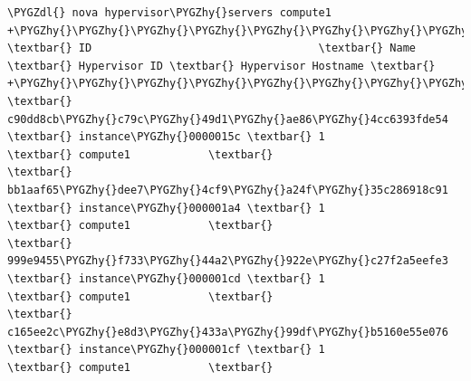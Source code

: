 \documentclass[letterpaper,10pt,english]{sphinxmanual}
\def\PYGZdl{\char`\$}
\def\PYGZhy{\char`\-}
\begin{document}
\begin{enumerate}
\begin{Verbatim}[commandchars=\\\{\}]
\PYGZdl{} nova hypervisor\PYGZhy{}servers compute1
+\PYGZhy{}\PYGZhy{}\PYGZhy{}\PYGZhy{}\PYGZhy{}\PYGZhy{}\PYGZhy{}\PYGZhy{}\PYGZhy{}\PYGZhy{}\PYGZhy{}\PYGZhy{}\PYGZhy{}\PYGZhy{}\PYGZhy{}\PYGZhy{}\PYGZhy{}\PYGZhy{}\PYGZhy{}\PYGZhy{}\PYGZhy{}\PYGZhy{}\PYGZhy{}\PYGZhy{}\PYGZhy{}\PYGZhy{}\PYGZhy{}\PYGZhy{}\PYGZhy{}\PYGZhy{}\PYGZhy{}\PYGZhy{}\PYGZhy{}\PYGZhy{}\PYGZhy{}\PYGZhy{}\PYGZhy{}\PYGZhy{}+\PYGZhy{}\PYGZhy{}\PYGZhy{}\PYGZhy{}\PYGZhy{}\PYGZhy{}\PYGZhy{}\PYGZhy{}\PYGZhy{}\PYGZhy{}\PYGZhy{}\PYGZhy{}\PYGZhy{}\PYGZhy{}\PYGZhy{}\PYGZhy{}\PYGZhy{}\PYGZhy{}\PYGZhy{}+\PYGZhy{}\PYGZhy{}\PYGZhy{}\PYGZhy{}\PYGZhy{}\PYGZhy{}\PYGZhy{}\PYGZhy{}\PYGZhy{}\PYGZhy{}\PYGZhy{}\PYGZhy{}\PYGZhy{}\PYGZhy{}\PYGZhy{}+\PYGZhy{}\PYGZhy{}\PYGZhy{}\PYGZhy{}\PYGZhy{}\PYGZhy{}\PYGZhy{}\PYGZhy{}\PYGZhy{}\PYGZhy{}\PYGZhy{}\PYGZhy{}\PYGZhy{}\PYGZhy{}\PYGZhy{}\PYGZhy{}\PYGZhy{}\PYGZhy{}\PYGZhy{}\PYGZhy{}\PYGZhy{}+
\textbar{} ID                                   \textbar{} Name              \textbar{} Hypervisor ID \textbar{} Hypervisor Hostname \textbar{}
+\PYGZhy{}\PYGZhy{}\PYGZhy{}\PYGZhy{}\PYGZhy{}\PYGZhy{}\PYGZhy{}\PYGZhy{}\PYGZhy{}\PYGZhy{}\PYGZhy{}\PYGZhy{}\PYGZhy{}\PYGZhy{}\PYGZhy{}\PYGZhy{}\PYGZhy{}\PYGZhy{}\PYGZhy{}\PYGZhy{}\PYGZhy{}\PYGZhy{}\PYGZhy{}\PYGZhy{}\PYGZhy{}\PYGZhy{}\PYGZhy{}\PYGZhy{}\PYGZhy{}\PYGZhy{}\PYGZhy{}\PYGZhy{}\PYGZhy{}\PYGZhy{}\PYGZhy{}\PYGZhy{}\PYGZhy{}\PYGZhy{}+\PYGZhy{}\PYGZhy{}\PYGZhy{}\PYGZhy{}\PYGZhy{}\PYGZhy{}\PYGZhy{}\PYGZhy{}\PYGZhy{}\PYGZhy{}\PYGZhy{}\PYGZhy{}\PYGZhy{}\PYGZhy{}\PYGZhy{}\PYGZhy{}\PYGZhy{}\PYGZhy{}\PYGZhy{}+\PYGZhy{}\PYGZhy{}\PYGZhy{}\PYGZhy{}\PYGZhy{}\PYGZhy{}\PYGZhy{}\PYGZhy{}\PYGZhy{}\PYGZhy{}\PYGZhy{}\PYGZhy{}\PYGZhy{}\PYGZhy{}\PYGZhy{}+\PYGZhy{}\PYGZhy{}\PYGZhy{}\PYGZhy{}\PYGZhy{}\PYGZhy{}\PYGZhy{}\PYGZhy{}\PYGZhy{}\PYGZhy{}\PYGZhy{}\PYGZhy{}\PYGZhy{}\PYGZhy{}\PYGZhy{}\PYGZhy{}\PYGZhy{}\PYGZhy{}\PYGZhy{}\PYGZhy{}\PYGZhy{}+
\textbar{} c90dd8cb\PYGZhy{}c79c\PYGZhy{}49d1\PYGZhy{}ae86\PYGZhy{}4cc6393fde54 \textbar{} instance\PYGZhy{}0000015c \textbar{} 1             \textbar{} compute1            \textbar{}
\textbar{} bb1aaf65\PYGZhy{}dee7\PYGZhy{}4cf9\PYGZhy{}a24f\PYGZhy{}35c286918c91 \textbar{} instance\PYGZhy{}000001a4 \textbar{} 1             \textbar{} compute1            \textbar{}
\textbar{} 999e9455\PYGZhy{}f733\PYGZhy{}44a2\PYGZhy{}922e\PYGZhy{}c27f2a5eefe3 \textbar{} instance\PYGZhy{}000001cd \textbar{} 1             \textbar{} compute1            \textbar{}
\textbar{} c165ee2c\PYGZhy{}e8d3\PYGZhy{}433a\PYGZhy{}99df\PYGZhy{}b5160e55e076 \textbar{} instance\PYGZhy{}000001cf \textbar{} 1             \textbar{} compute1            \textbar{}

\end{Verbatim}
\end{enumerate}
\end{document}
